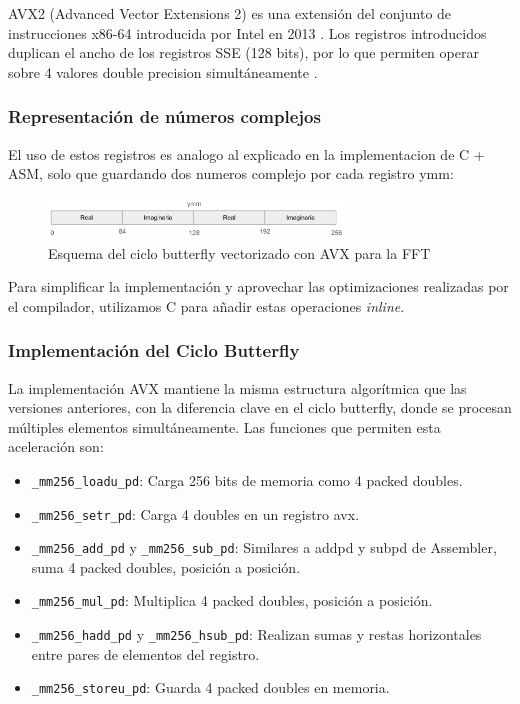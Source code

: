 \documentclass[a4paper]{article}
\begin{document}
AVX2 (Advanced Vector Extensions 2) es una extensión del conjunto de instrucciones x86-64 introducida por Intel en 2013 \cite{intel2016intrinsics}. Los registros introducidos duplican el ancho
de los registros SSE (128 bits), por lo que permiten operar sobre 4 valores double precision simultáneamente \cite{fog2016optimizing}.

\subsubsection{Representación de números complejos}

El uso de estos registros es analogo al explicado en la implementacion de C + ASM, solo que guardando dos numeros complejo por cada registro ymm:

\begin{figure}[h]
    \centering
    \includegraphics[width=0.7\textwidth]{extra/ymm complex.png}
    \caption{Esquema del ciclo butterfly vectorizado con AVX para la FFT}
    \label{fig:avx_butterfly}
\end{figure}

Para simplificar la implementación y aprovechar las optimizaciones realizadas por el compilador, utilizamos C para añadir estas operaciones \textit{inline}.

\subsubsection{Implementación del Ciclo Butterfly}

La implementación AVX mantiene la misma estructura algorítmica que las versiones anteriores, con la diferencia clave en el ciclo butterfly, donde se procesan
múltiples elementos simultáneamente. Las funciones que permiten esta aceleración son:
\begin{itemize}
    \item \texttt{\_mm256\_loadu\_pd}: Carga 256 bits de memoria como 4 packed doubles.
    \item \texttt{\_mm256\_setr\_pd}: Carga 4 doubles en un registro avx.
    \item \texttt{\_mm256\_add\_pd} y \texttt{\_mm256\_sub\_pd}: Similares a addpd y subpd de Assembler, suma 4 packed doubles, posición a posición.
    \item \texttt{\_mm256\_mul\_pd}: Multiplica 4 packed doubles, posición a posición.
    \item \texttt{\_mm256\_hadd\_pd} y \texttt{\_mm256\_hsub\_pd}: Realizan sumas y restas horizontales entre pares de elementos del registro.
    \item \texttt{\_mm256\_storeu\_pd}: Guarda 4 packed doubles en memoria.
\end{itemize}
\end{document}

